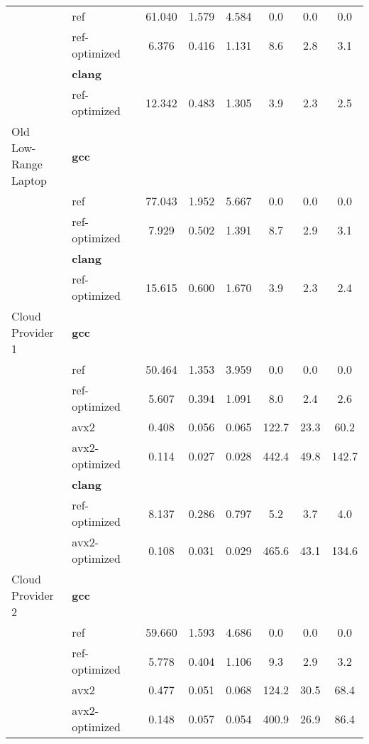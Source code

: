 \begin{table}[H]
\begin{tabularx}{\linewidth}{l l c c c c c c}
          & ref & 61.040 & 1.579 & 4.584 & 0.0 & 0.0 & 0.0\\
          & ref-optimized & 6.376 & 0.416 & 1.131 & 8.6 & 2.8 & 3.1\\
          & \textbf{clang} & & & & & \\
          & ref-optimized & 12.342 & 0.483 & 1.305 & 3.9 & 2.3 & 2.5\\
          \midrule
          \multirowcell{5}{Old\\ Low-Range\\ Laptop}
          & \textbf{gcc} & & & & & \\
          & ref & 77.043 & 1.952 & 5.667 & 0.0 & 0.0 & 0.0\\
          & ref-optimized & 7.929 & 0.502 & 1.391 & 8.7 & 2.9 & 3.1\\
          & \textbf{clang} & & & & & \\
          & ref-optimized & 15.615 & 0.600 & 1.670 & 3.9 & 2.3 & 2.4\\
          \midrule
          \multirowcell{8}{Cloud\\ Provider\\ 1}
          & \textbf{gcc} & & & & & \\
          & ref & 50.464 & 1.353 & 3.959 & 0.0 & 0.0 & 0.0\\
          & ref-optimized & 5.607 & 0.394 & 1.091 & 8.0 & 2.4 & 2.6\\
          & avx2 & 0.408 & 0.056 & 0.065 & 122.7 & 23.3 & 60.2\\
          & avx2-optimized & 0.114 & 0.027 & 0.028 & 442.4 & 49.8 & 142.7\\
          & \textbf{clang} & & & & & \\
          & ref-optimized & 8.137 & 0.286 & 0.797 & 5.2 & 3.7 & 4.0\\
          & avx2-optimized & 0.108 & 0.031 & 0.029 & 465.6 & 43.1 & 134.6\\
          \midrule
          \multirowcell{8}{Cloud\\ Provider\\ 2}
          & \textbf{gcc} & & & & & \\
          & ref & 59.660 & 1.593 & 4.686 & 0.0 & 0.0 & 0.0\\
          & ref-optimized & 5.778 & 0.404 & 1.106 & 9.3 & 2.9 & 3.2\\
          & avx2 & 0.477 & 0.051 & 0.068 & 124.2 & 30.5 & 68.4\\
          & avx2-optimized & 0.148 & 0.057 & 0.054 & 400.9 & 26.9 & 86.4\\

\end{tabularx}
\end{table}
